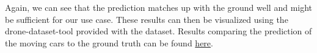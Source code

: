 Again, we can see that the prediction matches up with the ground well and might be sufficient for our use case.
These results can then be visualized using the drone-dataset-tool provided with the dataset.
Results comparing the prediction of the moving cars to the ground truth can be found \href{https://github.com/avocadoali/social_ai_practical_course}{here}.

